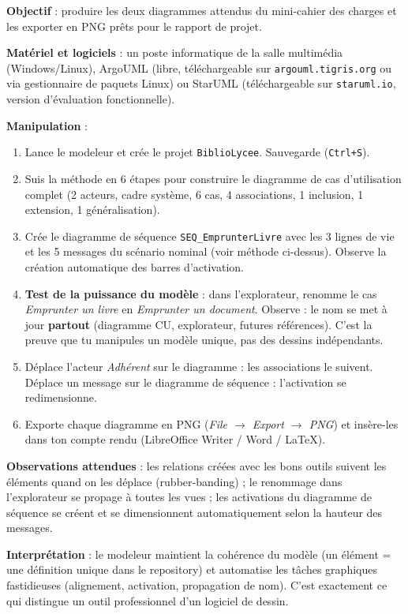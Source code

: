 \documentclass[11pt]{article}
\begin{document}
\begin{experience}
\textbf{Objectif} : produire les deux diagrammes attendus du mini-cahier des charges et les exporter en PNG prêts pour le rapport de projet.

\textbf{Matériel et logiciels} : un poste informatique de la salle multimédia (Windows/Linux), ArgoUML (libre, téléchargeable sur \texttt{argouml.tigris.org} ou via gestionnaire de paquets Linux) ou StarUML (téléchargeable sur \texttt{staruml.io}, version d'évaluation fonctionnelle).

\textbf{Manipulation} :
\begin{enumerate}
\item Lance le modeleur et crée le projet \texttt{BiblioLycee}. Sauvegarde (\texttt{Ctrl+S}).
\item Suis la méthode en 6 étapes pour construire le diagramme de cas d'utilisation complet (2 acteurs, cadre système, 6 cas, 4 associations, 1 inclusion, 1 extension, 1 généralisation).
\item Crée le diagramme de séquence \texttt{SEQ\_EmprunterLivre} avec les 3 lignes de vie et les 5 messages du scénario nominal (voir méthode ci-dessus). Observe la création automatique des barres d'activation.
\item \textbf{Test de la puissance du modèle} : dans l'explorateur, renomme le cas \emph{Emprunter un livre} en \emph{Emprunter un document}. Observe : le nom se met à jour \textbf{partout} (diagramme CU, explorateur, futures références). C'est la preuve que tu manipules un modèle unique, pas des dessins indépendants.
\item Déplace l'acteur \emph{Adhérent} sur le diagramme : les associations le suivent. Déplace un message sur le diagramme de séquence : l'activation se redimensionne.
\item Exporte chaque diagramme en PNG (\emph{File $\rightarrow$ Export $\rightarrow$ PNG}) et insère-les dans ton compte rendu (LibreOffice Writer / Word / LaTeX).
\end{enumerate}

\textbf{Observations attendues} : les relations créées avec les bons outils suivent les éléments quand on les déplace (rubber-banding) ; le renommage dans l'explorateur se propage à toutes les vues ; les activations du diagramme de séquence se créent et se dimensionnent automatiquement selon la hauteur des messages.

\textbf{Interprétation} : le modeleur maintient la cohérence du modèle (un élément = une définition unique dans le repository) et automatise les tâches graphiques fastidieuses (alignement, activation, propagation de nom). C'est exactement ce qui distingue un outil professionnel d'un logiciel de dessin.
\end{experience}
\end{document}
